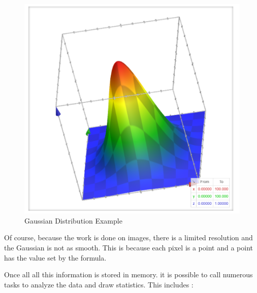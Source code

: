 \documentclass[a4paper,11pt]{report}
\numberwithin{figure}{section} %
\begin{document}
    \begin{figure}[H]
      \centering
      \includegraphics[width=.45\linewidth]{gaussian2D.png}
      \caption{Gaussian Distribution Example}
      \label{fig:gaus22}
    \end{figure}

    Of course, because the work is done on images, there is a limited resolution and the Gaussian is not as smooth.
    This is because each pixel is a point and a point has the value set by the formula.
    \newline

    Once all all this information is stored in memory.
    it is possible to call numerous tasks to analyze the data and draw statistics.
    This includes :
\end{document}
